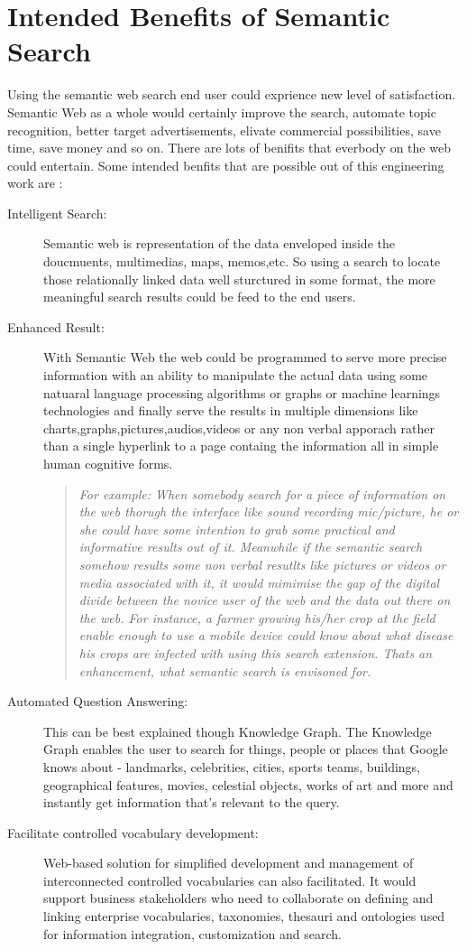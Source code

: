 \documentclass[12pt,a4]{article}
\begin{document}
\section{Intended Benefits of Semantic Search}
Using the semantic web search end user could exprience new level of satisfaction. Semantic Web as a whole would certainly improve the search, automate topic recognition, better target advertisements, elivate commercial possibilities, save time, save money and so on. There are lots of benifits that everbody on the web could entertain. Some intended benfits that are possible out of this engineering work are :
\begin{description}
\item[Intelligent Search:] Semantic web is representation of the data enveloped inside the doucmuents, multimedias, maps, memos,etc. So using a search to locate those relationally linked data well sturctured in some format, the more meaningful search results could be feed to the end users.
\item[Enhanced Result:] With Semantic Web the web could be programmed to serve more precise information with an ability to manipulate the actual data using some natuaral language processing algorithms or graphs or machine learnings technologies and finally serve the results in multiple dimensions like charts,graphs,pictures,audios,videos or any non verbal apporach rather than a single hyperlink to a page containg the information all in simple human cognitive forms.\begin{quote}\textit{For example:  When somebody search for a piece of information on the web thorugh the interface like sound recording mic/picture, he or she could have some intention to grab some practical and informative results out of it. Meanwhile if the semantic search somehow results some non verbal resutlts like pictures or videos or media associated with it, it would mimimise the gap of the digital divide between the novice user of the web and the data out there on the web. For instance, a farmer growing his/her crop at the field enable enough to use a mobile device could know about what disease his crops are infected with using this search extension. Thats an enhancement, what semantic search is envisoned for.}\end{quote}

\item[Automated Question Answering:] This can be best explained though Knowledge Graph. The Knowledge Graph enables the user to search for things, people or places that Google knows about - landmarks, celebrities, cities, sports teams, buildings, geographical features, movies, celestial objects, works of art and more and instantly get information that’s relevant to the query.

\item[Facilitate controlled vocabulary development:] Web-based solution for simplified development and management of interconnected controlled vocabularies can also facilitated. It would support business stakeholders who need to collaborate on defining and linking enterprise vocabularies, taxonomies, thesauri and ontologies used for information integration, customization and search.
\end{description}
\end{document}
